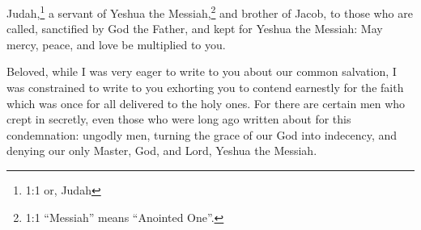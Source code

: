





\vspace{-1.36in}


\mychapter{}  \myverse*{}Judah,\footnote{1:1 or, Judah} a servant of Yeshua the Messiah,\footnote{1:1 “Messiah” means “Anointed One”.} and brother of Jacob, to those who are called, sanctified by God the Father, and kept for Yeshua the Messiah: \myverse{}May mercy, peace, and love be multiplied to you.


\myverse{}Beloved, while I was very eager to write to you about our common salvation, I was constrained to write to you exhorting you to contend earnestly for the faith which was once for all delivered to the holy ones. \myverse{}For there are certain men who crept in secretly, even those who were long ago written about for this condemnation: ungodly men, turning the grace of our God into indecency, and denying our only Master, God, and Lord, Yeshua the Messiah.


